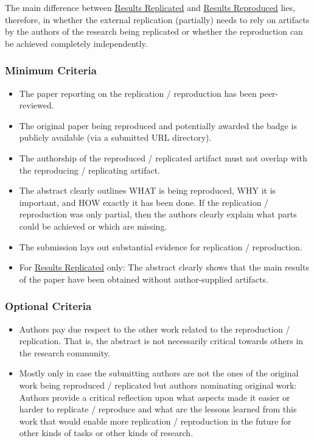 \documentclass[twoside,a4paper]{refart}
\newcommand{\reproduced}{\protect\hyperlink{reproduced}{Results Reproduced}\xspace}
\newcommand{\replicated}{\protect\hyperlink{replicated}{Results Replicated}\xspace}
\begin{document}
The main difference between \replicated and \reproduced lies,
therefore, in whether the external replication (partially) needs to
rely on artifacts by the authors of the research being replicated or
whether the reproduction can be achieved completely independently.

\subsubsection{Minimum Criteria}

\begin{itemize}
\item[\Checkedbox] The paper reporting on the replication /
  reproduction has been peer-reviewed.
\item[\Checkedbox] The original paper being reproduced and potentially
  awarded the badge is publicly available (via a submitted URL
  directory).
\item[\Checkedbox] The authorship of the reproduced / replicated
  artifact must not overlap with the reproducing / replicating
  artifact.
\item[\Checkedbox] The abstract clearly outlines WHAT is being
  reproduced, WHY it is important, and HOW exactly it has been done.
  If the replication / reproduction was only partial, then the authors
  clearly explain what parts could be achieved or which are missing.
\item[\Checkedbox] The submission lays out substantial evidence for
  replication / reproduction.
\item[\Checkedbox] For \replicated only: The abstract clearly shows
  that the main results of the paper have been obtained without
  author-supplied artifacts.
\end{itemize}


\subsubsection{ Optional Criteria}

\begin{itemize}
\item[\Checkedbox] Authors pay due respect to the other work related
  to the reproduction / replication. That is, the abstract is not
  necessarily critical towards others in the research community.
\item[\Checkedbox] Mostly only in case the submitting authors are not
  the ones of the original work being reproduced / replicated but
  authors nominating original work: Authors provide a critical
  reflection upon what aspects made it easier or harder to replicate /
  reproduce and what are the lessons learned from this work that would
  enable more replication / reproduction in the future for other kinds
  of tasks or other kinds of research.
\end{itemize}
\end{document}
